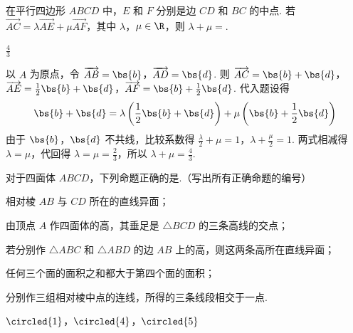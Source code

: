 \begin{problem}
在平行四边形 \(ABCD\) 中，\(E\) 和 \(F\) 分别是边 \(CD\) 和 \(BC\) 的中点. 若 \(\overrightarrow{AC} = \lambda \overrightarrow{AE} + \mu \overrightarrow{AF}\)，其中 \(\lambda\)，\(\mu \in \R\)，则 \(\lambda + \mu =\)\fillinblank{}.
\end{problem}

\begin{answer}
\(\frac{4}{3}\)
\end{answer}

\begin{solution}
以 \(A\) 为原点，令 \(\overrightarrow{AB}=\bs{b}\)，\(\overrightarrow{AD}=\bs{d}\). 则
\(\overrightarrow{AC}=\bs{b}+\bs{d}\)，\(\overrightarrow{AE}=\frac{1}{2}\bs{b}+\bs{d}\)，\(\overrightarrow{AF}=\bs{b}+\frac{1}{2}\bs{d}\).
代入题设得
\[
\bs{b}+\bs{d}
=\lambda\left(\frac{1}{2}\bs{b}+\bs{d}\right)
+\mu\left(\bs{b}+\frac{1}{2}\bs{d}\right)
\]
由于 \(\bs{b}\)，\(\bs{d}\) 不共线，比较系数得
\(\frac{\lambda}{2}+\mu=1\)，\(\lambda+\frac{\mu}{2}=1\).
两式相减得 \(\lambda=\mu\)，代回得 \(\lambda=\mu=\frac{2}{3}\)，所以 \(\lambda+\mu=\frac{4}{3}\).
\end{solution}

\begin{problem}
对于四面体 \(ABCD\)，下列命题正确的是\fillinblank{}.（写出所有正确命题的编号）

\begin{circlelist}
\item 相对棱 \(AB\) 与 \(CD\) 所在的直线异面；
\item 由顶点 \(A\) 作四面体的高，其垂足是 \(\triangle BCD\) 的三条高线的交点；
\item 若分别作 \(\triangle ABC\) 和 \(\triangle ABD\) 的边 \(AB\) 上的高，则这两条高所在直线异面；
\item 任何三个面的面积之和都大于第四个面的面积；
\item 分别作三组相对棱中点的连线，所得的三条线段相交于一点.
\end{circlelist}
\end{problem}

\begin{answer}
\(\circled{1}\)，\(\circled{4}\)，\(\circled{5}\)
\end{answer}

